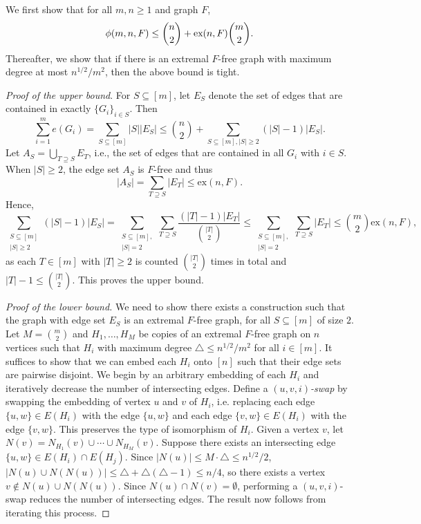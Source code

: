 \documentclass[12pt]{article}
\newcommand*{\ex}{\textnormal{ex}}
\begin{document}
We first show that for all 
$m,n \geq 1$ and graph $F$, 
\[  
  \phi(m, n ,F) \leq \binom{n}{2} + \ex(n, F)\binom{m}{2}.  
\]
Thereafter, we show that if there is an extremal $F$-free graph with maximum degree at most $n^{1/2}/m^2$, then the above bound is tight. 

\textit{Proof of the upper bound}. For $S \subseteq [m]$, let $E_S$ denote the set of edges that are contained in exactly $\{G_i\}_{i \in S}$. Then 
\[
  \sum_{i = 1}^m e(G_i) = \sum_{S \subseteq [m]} |S||E_S| \leq \binom{n}{2} + \sum_{S \subseteq [m], |S| \geq 2} (|S| - 1)|E_S|.
\]
Let $A_S = \bigcup_{T \supseteq S} E_T$, i.e., the set of edges that are contained in all $G_i$ with $i \in S$. When $|S| \geq 2$, the edge set $A_S$ is $F$-free and thus 
\[
  |A_S| = \sum_{T \supseteq S} |E_T| \leq \text{ex}(n, F).
\]
Hence,
\[
  \sum_{\substack{S \subseteq [m] \\ |S| \geq 2}} (|S| - 1)|E_S| = \sum_{\substack{S \subseteq [m], \\ |S| = 2}} \sum_{T \supseteq S} \frac{(|T| - 1)|E_T|}{\binom{|T|}{2}} \leq \sum_{\substack{S \subseteq [m], \\ |S| = 2}} \sum_{T \supseteq S} |E_T| \leq \binom{m}{2}\text{ex}(n, F),
\]
as each $T \in [m]$ with $|T| \geq 2$ is counted $\binom{|T|}{2}$ times in total and $|T| - 1 \leq \binom{|T|}{2}$. This proves the upper bound.

\begin{proof}[Proof of the lower bound]
  We need to show there exists a construction such that the graph with edge set $E_S$ is an extremal $F$-free graph, for all $S \subseteq [m]$ of size $2$. Let $M = \binom{m}{2}$ and $H_1, \ldots, H_M$ be copies of an extremal $F$-free graph on $n$ vertices such that $H_i$ with maximum degree $\triangle \leq n^{1/2}/m^2$ for all $i \in [m]$. It suffices to show that we can embed each $H_i$ onto $[n]$ such that their edge sets are pairwise disjoint. We begin by an arbitrary embedding of each $H_i$ and iteratively decrease the number of intersecting edges. Define a \textit{$(u, v, i)$-swap} by swapping the embedding of vertex $u$ and $v$ of $H_i$, i.e. replacing each edge $\{u, w\} \in E(H_i)$ with the edge $\{u, w\}$ and each edge $\{v, w\} \in E(H_i)$ with the edge $\{v, w\}$. This preserves the type of isomorphism of $H_i$. Given a vertex $v$, let $N(v) = N_{H_1}(v) \cup \cdots \cup N_{H_M}(v)$. Suppose there exists an intersecting edge $\{u, w\} \in E(H_i) \cap E(H_j)$. Since $|N(u)| \leq M \cdot \triangle \leq n^{1/2}/2$, $|N(u) \cup N(N(u))| \leq \triangle + \triangle(\triangle - 1) \leq n/4$, so there exists a vertex $v \notin N(u) \cup N(N(u))$. Since $N(u) \cap N(v) = \emptyset$, performing a $(u, v, i)$-swap reduces the number of intersecting edges. The result now follows from iterating this process.
\end{proof}
\end{document}
